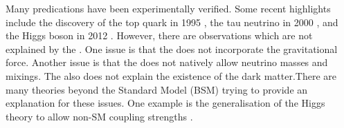 Many \SM predications have been experimentally verified. Some recent highlights include the discovery of the top quark in 1995 \cite{Abachi:1995iq}, the tau neutrino in 2000 \cite{Kodama:2000mp}, and the Higgs boson in 2012 \cite{Aad:2012tfa,Chatrchyan:2012ufa}. However, there are observations which are not explained by the \SM. One issue is that the \SM does not incorporate the gravitational force. Another issue is that the \SM does not natively allow neutrino masses and mixings. The \SM also does not explain the existence of the dark matter.There are many theories beyond the Standard Model (BSM) trying to provide an explanation for these issues. One example is the generalisation of the Higgs theory to allow non-SM coupling strengths \cite{Kaplan:1983fs,Goldberger:2008zz}.

